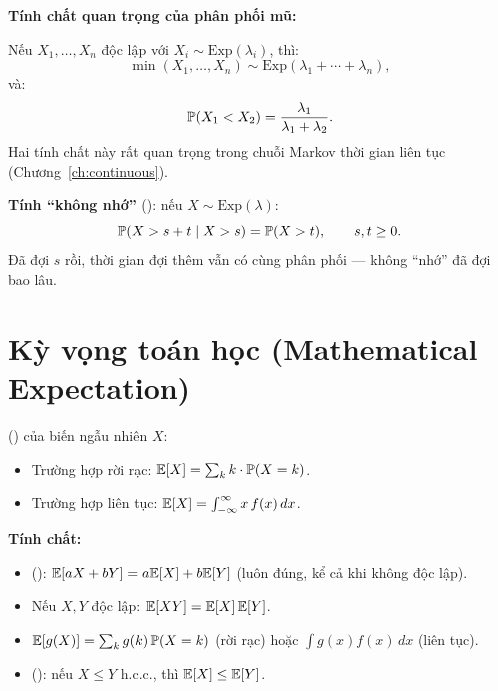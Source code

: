 \begin{congthuc}
\textbf{Tính chất quan trọng của phân phối mũ:}

Nếu $X_1, \ldots, X_n$ độc lập với $X_i \sim \text{Exp}(\lambda_i)$, thì:
\begin{equation}\label{eq:min-exp}
  \min(X_1, \ldots, X_n) \sim \text{Exp}(\lambda_1 + \cdots + \lambda_n),
\end{equation}
và:
\begin{equation}\label{eq:compete-exp}
  \mathbb{P}(X_1 < X_2) = \frac{\lambda_1}{\lambda_1 + \lambda_2}.
\end{equation}
Hai tính chất này rất quan trọng trong chuỗi Markov thời gian liên tục (Chương~\ref{ch:continuous}).

\textbf{Tính ``không nhớ''} (): nếu $X \sim \text{Exp}(\lambda)$:
\[
  \mathbb{P}(X > s + t \mid X > s) = \mathbb{P}(X > t), \qquad s, t \geq 0.
\]
Đã đợi $s$ rồi, thời gian đợi thêm vẫn có cùng phân phối --- không ``nhớ'' đã đợi bao lâu.
\end{congthuc}

\section{Kỳ vọng toán học (Mathematical Expectation)}

\begin{dinhnghia}
 () của biến ngẫu nhiên $X$:
\begin{itemize}[nosep]
  \item Trường hợp rời rạc: $\mathbb{E}[X] = \sum_{k} k \cdot \mathbb{P}(X = k)$.
  \item Trường hợp liên tục: $\mathbb{E}[X] = \int_{-\infty}^{\infty} x\, f(x)\,dx$.
\end{itemize}
\end{dinhnghia}

\textbf{Tính chất:}
\begin{itemize}[nosep]
  \item {} (): $\mathbb{E}[aX + bY] = a\mathbb{E}[X] + b\mathbb{E}[Y]$ (luôn đúng, kể cả khi không độc lập).
  \item Nếu $X, Y$ độc lập: $\mathbb{E}[XY] = \mathbb{E}[X]\,\mathbb{E}[Y]$.
  \item $\mathbb{E}[g(X)] = \sum_k g(k)\,\mathbb{P}(X = k)$ (rời rạc) hoặc $\int g(x) f(x)\,dx$ (liên tục).
  \item {} (): nếu $X \leq Y$ h.c.c., thì $\mathbb{E}[X] \leq \mathbb{E}[Y]$.
\end{itemize}


